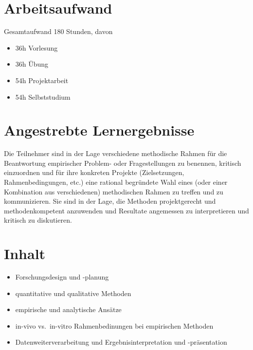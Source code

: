 \section*{Arbeitsaufwand\label{/mi-2017/modulbeschreibungen-master/MA_All_Research_Methods}}\label{arbeitsaufwandpathlabelmi-2017modulbeschreibungen-mastermaux5fallux5fresearchux5fmethods}

Gesamtaufwand 180 Stunden, davon

\begin{itemize}
\tightlist
\item
  36h Vorlesung
\item
  36h Übung
\item
  54h Projektarbeit
\item
  54h Selbststudium
\end{itemize}

\section*{Angestrebte
Lernergebnisse\label{/mi-2017/modulbeschreibungen-master/MA_All_Research_Methods}}\label{angestrebte-lernergebnissepathlabelmi-2017modulbeschreibungen-mastermaux5fallux5fresearchux5fmethods}

Die Teilnehmer sind in der Lage verschiedene methodische Rahmen für die
Beantwortung empirischer Problem- oder Fragestellungen zu benennen,
kritisch einzuordnen und für ihre konkreten Projekte (Zielsetzungen,
Rahmenbedingungen, etc.) eine rational begründete Wahl eines (oder einer
Kombination aus verschiedenen) methodischen Rahmen zu treffen und zu
kommunizieren. Sie sind in der Lage, die Methoden projektgerecht und
methodenkompetent anzuwenden und Resultate angemessen zu interpretieren
und kritisch zu diskutieren.

\section*{Inhalt\label{/mi-2017/modulbeschreibungen-master/MA_All_Research_Methods}}\label{inhaltpathlabelmi-2017modulbeschreibungen-mastermaux5fallux5fresearchux5fmethods}

\begin{itemize}
\tightlist
\item
  Forschungsdesign und -planung
\item
  quantitative und qualitative Methoden
\item
  empirische und analytische Ansätze
\item
  in-vivo vs.~in-vitro Rahmenbedinungen bei empirischen Methoden
\item
  Datenweiterverarbeitung und Ergebnisinterpretation und -präsentation
\end{itemize}

